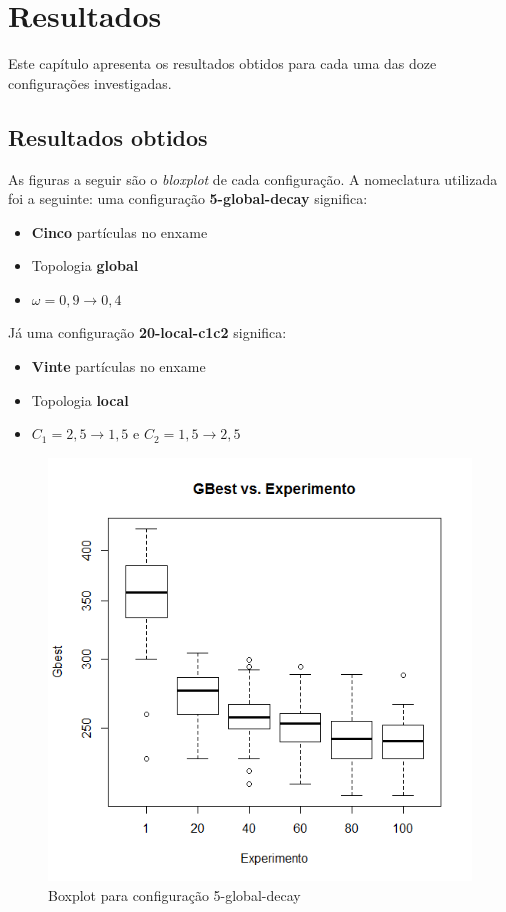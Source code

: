 \chapter{Resultados}
Este cap\'itulo apresenta os resultados obtidos para cada uma das doze configura\c{c}\~oes investigadas.

\section{Resultados obtidos}
As figuras a seguir s\~ao o \textit{bloxplot} de cada configura\c{c}\~ao. A nomeclatura utilizada foi a seguinte: uma configura\c{c}\~ao \textbf{5-global-decay} significa:
\begin{itemize}
	\item \textbf{Cinco} part\'iculas no enxame
	\item Topologia \textbf{global}
	\item $\omega = 0,9 \rightarrow 0,4$
\end{itemize}
J\'a uma configura\c{c}\~ao \textbf{20-local-c1c2} significa:
\begin{itemize}
	\item \textbf{Vinte} part\'iculas no enxame
	\item Topologia \textbf{local}
	\item $C_1 = 2,5 \rightarrow 1,5$ e $C_2 = 1,5 \rightarrow 2,5$
\end{itemize}

\begin{figure}[H]
	\centering
	\includegraphics[width=.6\textwidth]{img/result_5_global_decay.png}
	\caption{Boxplot para configura\c{c}\~ao 5-global-decay}
	\label{fig:result_5_global_decay}
\end{figure}


